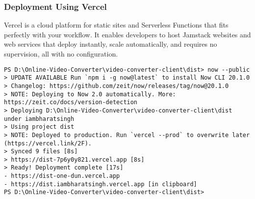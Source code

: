\subsubsection{Deployment Using Vercel}
​Vercel is a cloud platform for static sites and Serverless Functions that fits perfectly with your workflow. It enables developers to host Jamstack websites and web services that deploy instantly, scale automatically, and requires no supervision, all with no configuration.

\begin{verbatim}
PS D:\Online-Video-Converter\video-converter-client\dist> now --public
> UPDATE AVAILABLE Run `npm i -g now@latest` to install Now CLI 20.1.0
> Changelog: https://github.com/zeit/now/releases/tag/now@20.1.0
> NOTE: Deploying to Now 2.0 automatically. More: https://zeit.co/docs/version-detection
> Deploying D:\Online-Video-Converter\video-converter-client\dist under iambharatsingh
> Using project dist
> NOTE: Deployed to production. Run `vercel --prod` to overwrite later (https://vercel.link/2F).
> Synced 9 files [8s]
> https://dist-7p6y0y821.vercel.app [8s]
> Ready! Deployment complete [17s]
- https://dist-one-dun.vercel.app
- https://dist.iambharatsingh.vercel.app [in clipboard]
PS D:\Online-Video-Converter\video-converter-client\dist>
\end{verbatim}
